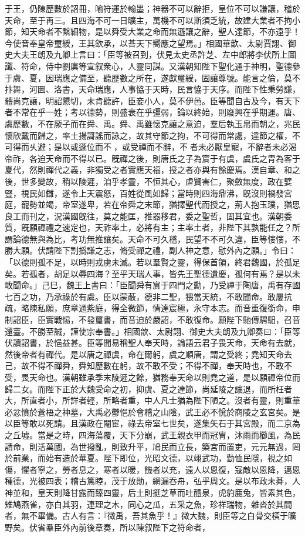 \begin{pinyinscope}
于王，仍陳歷數於詔冊，喻符運於翰墨；神器不可以辭拒，皇位不可以謙讓，稽於天命，至于再三。且四海不可一日曠主，萬機不可以斯須乏統，故建大業者不拘小節，知天命者不繫細物，是以舜受大業之命而無遜讓之辭，聖人達節，不亦遠乎！今使音奉皇帝璽綬，王其欽承，以荅天下嚮應之望焉。」相國華歆、太尉賈詡、御史大夫王朗及九卿上言曰：「臣等被召到，伏見太史丞許芝、左中郎將李伏所上圖讖、符命，侍中劉廙等宣叙衆心，人靈同謀。又漢朝知陛下聖化通于神明，聖德參于虞、夏，因瑞應之備至，聽歷數之所在，遂獻璽綬，固讓尊號。能言之倫，莫不抃舞，河圖、洛書，天命瑞應，人事恊于天時，民言恊于天序。而陛下性秉勞謙，體尚克讓，明詔懇切，未肯聽許，臣妾小人，莫不伊邑。臣等聞自古及今，有天下者不常在乎一姓；考以德勢，則盛衰在乎彊弱，論以終始，則廢興在乎期運。唐、虞歷數，不在厥子而在舜、禹。舜、禹雖懷克讓之意迫，羣后執玉帛而朝之，兆民懷欣戴而歸之，率土揚謌謠而詠之，故其守節之拘，不可得而常處，達節之權，不可得而乆避；是以或遜位而不𠫤，或受禪而不辭，不𠫤者未必厭皇寵，不辭者未必渴帝祚，各迫天命而不得以已。旣禪之後，則唐氏之子為賔于有虞，虞氏之冑為客于夏代，然則禪代之義，非獨受之者實應天福，授之者亦與有餘慶焉。漢自章、和之後，世多變故，稍以陵遲，洎乎孝靈，不恒其心，虐賢害仁，聚斂無度，政在嬖豎，視民如讎，遂令上天震怒，百姓從風如歸；當時則四海鼎沸，旣沒則禍發宮庭，寵勢並竭，帝室遂卑，若在帝舜之末節，猶擇聖代而授之，荊人抱玉璞，猶思良工而刊之，況漢國旣往，莫之能匡，推器移君，委之聖哲，固其宜也。漢朝委質，旣願禪禮之速定也，天祚率土，必將有主；主率土者，非陛下其孰能任之？所謂論德無與為比，考功無推讓矣。天命不可久稽，民望不不可久違，臣等慺慺，不勝大願。伏請陛下割撝謙之志，脩受禪之禮，副人神之意，慰外內之願。」令曰：「以德則孤不足，以時則戎虜未滅。若以羣賢之靈，得保首領，終君魏國，於孤足矣。若孤者，胡足以辱四海？至乎天瑞人事，皆先王聖德遺慶，孤何有焉？是以未敢聞命。」己巳，魏王上書曰：「臣聞舜有賔于四門之勳，乃受禪于陶唐，禹有存國七百之功，乃承祿於有虞。臣以蒙蔽，德非二聖，猥當天統，不敢聞命。敢屢抗疏，略陳私願，庶章通紫庭，得全微節，情達宸極，永守本志。而音重復銜命，申制詔臣，臣實戰惕，不發璽書，而音迫於嚴詔，不敢復命。願陛下馳傳騁馹，召音還臺。不勝至誠，謹使宗奉書。」相國歆、太尉詡、御史大夫朗及九卿奏曰：「臣等伏讀詔書，於悒益甚。臣等聞易稱聖人奉天時，論語云君子畏天命，天命有去就，然後帝者有禪代。是以唐之禪虞，命在爾躬，虞之順唐，謂之受終；堯知天命去己，故不得不禪舜，舜知歷數在躬，故不敢不受；不得不禪，奉天時也，不敢不受，畏天命也。漢朝雖承季末陵遲之餘，猶務奉天命以則堯之道，是以願禪帝位而歸二女。而陛下正於大魏受命之初，抑虞、夏之達節，尚延陵之讓退，而所枉者大，所直者小，所詳者輕，所略者重，中人凡士猶為陛下陋之。沒者有靈，則重華必忿憤於蒼梧之神墓，大禹必鬱悒於會稽之山陰，武王必不恱於商陵之玄宮矣。是以臣等敢以死請。且漢政在閹宦，祿去帝室七世矣，遂集矢石于其宮殿，而二京為之丘墟。當是之時，四海蕩覆，天下分崩，武王親衣甲而冠冑，沐雨而櫛風，為民請命，則活萬國，為世撥亂，則致升平，鳩民而立長，築宮而置吏，元元無過，罔於前業，而始有造於華夏。陛下即位，光昭文德，以翊武功，勤恤民隱，視之如傷，懼者寧之，勞者息之，寒者以暖，饑者以充，遠人以恩復，寇敵以恩降，邁恩種德，光被四表；稽古篤睦，茂于放勛，網漏吞舟，弘乎周文。是以布政未朞，人神並和，皇天則降甘露而臻四靈，后土則挺芝草而吐醴泉，虎豹鹿兔，皆素其色，雉鳩燕雀，亦白其羽，連理之木，同心之瓜，五采之魚，珍祥瑞物，雜沓於其間者，無不畢備。古人有言：『微禹，吾其魚乎！』微大魏，則臣等之白骨交橫于曠野矣。伏省羣臣外內前後章奏，所以陳叙陛下之符命者，
\end{pinyinscope}
